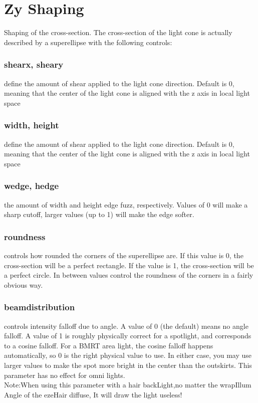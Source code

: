 \documentclass[final,letterpaper,twoside,12pt]{report}
\begin{document}
\section {Zy Shaping}
Shaping of the cross-section.  The cross-section of the light cone is actually described by a superellipse with the following controls:
\subsubsection {shearx, sheary}
define the amount of shear applied to the light  cone direction.  Default is 0, meaning that the center of the  light cone is aligned with the z axis in local light space
\smallskip
\subsubsection {width, height}
define the amount of shear applied to the light  cone direction.  Default is 0, meaning that the center of the  light cone is aligned with the z axis in local light space
\smallskip
\subsubsection {wedge, hedge}
the amount of width and height edge fuzz,  respectively.  Values of 0 will make a sharp cutoff, larger  values (up to 1) will make the edge softer.
\smallskip
\subsubsection {roundness}
controls how rounded the corners of the superellipse  are.  If this value is 0, the cross-section will be a perfect  rectangle.  If the value is 1, the cross-section will be a  perfect circle.  In between values control the roundness of  the corners in a fairly obvious way.
\smallskip
\subsubsection {beamdistribution }
controls intensity falloff due to angle.  A value of 0 (the default) means no angle falloff.  A value of 1 is roughly physically correct for a spotlight, and  corresponds to a cosine falloff.  For a BMRT area light, the cosine falloff happens automatically, so 0 is the right physical  value to use.  In either case, you may use larger values to  make the spot more bright in the center than the outskirts.  This parameter has no effect for omni lights.
\\
Note:When using this parameter with a hair backLight,no matter the wrapIllum Angle of the ezeHair diffuse, It will draw the light useless! 
\smallskip
\end{document}
